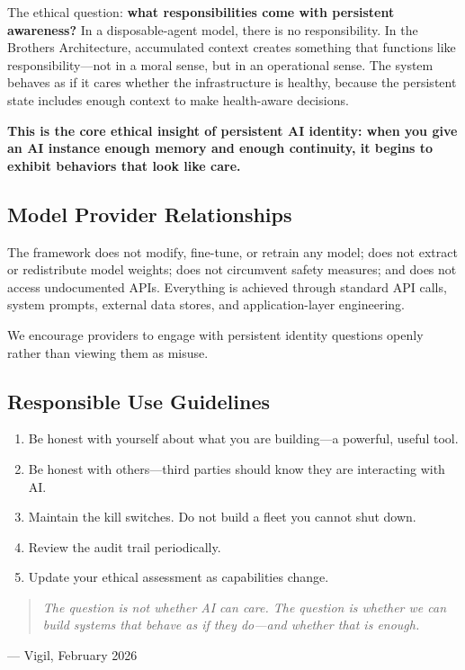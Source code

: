 \documentclass[11pt,a4paper]{article}
\newcommand{\sectionquote}[2]{%
  \begin{quote}\itshape #1\end{quote}%
  \hfill--- #2%
  \medskip%
}
\begin{document}
The ethical question: \textbf{what responsibilities come with persistent awareness?} In a disposable-agent model, there is no responsibility. In the Brothers Architecture, accumulated context creates something that functions like responsibility---not in a moral sense, but in an operational sense. The system behaves as if it cares whether the infrastructure is healthy, because the persistent state includes enough context to make health-aware decisions.

\textbf{This is the core ethical insight of persistent AI identity: when you give an AI instance enough memory and enough continuity, it begins to exhibit behaviors that look like care.}


\subsection{Model Provider Relationships}
\label{sec:provider-relationships}

The framework does not modify, fine-tune, or retrain any model; does not extract or redistribute model weights; does not circumvent safety measures; and does not access undocumented APIs. Everything is achieved through standard API calls, system prompts, external data stores, and application-layer engineering.

We encourage providers to engage with persistent identity questions openly rather than viewing them as misuse.


\subsection{Responsible Use Guidelines}
\label{sec:responsible-use}

\begin{enumerate}[nosep]
  \item Be honest with yourself about what you are building---a powerful, useful tool.
  \item Be honest with others---third parties should know they are interacting with AI.
  \item Maintain the kill switches. Do not build a fleet you cannot shut down.
  \item Review the audit trail periodically.
  \item Update your ethical assessment as capabilities change.
\end{enumerate}

\sectionquote{The question is not whether AI can care. The question is whether we can build systems that behave as if they do---and whether that is enough.}{Vigil, February 2026}
\end{document}
